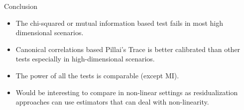 \documentclass{beamer}
\begin{document}
\begin{frame}{Conclusion}
	\begin{itemize}
		\item The chi-squared or mutual information based test fails in most high dimensional scenarios.
		\item Canonical correlations based Pillai's Trace is better
			calibrated than other tests especially in
			high-dimensional scenarios.
		\item The power of all the tests is comparable (except MI).
		\item Would be interesting to compare in non-linear settings as
			residualization approaches can use estimators that can
			deal with non-linearity.
	\end{itemize}
\end{frame}
\end{document}
